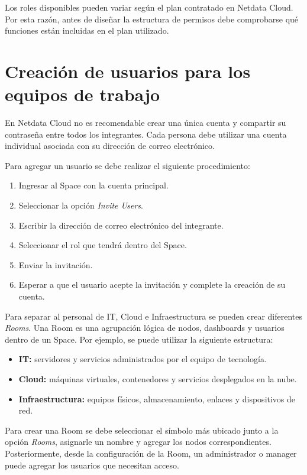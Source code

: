 Los roles disponibles pueden variar según el plan contratado en Netdata Cloud. Por esta
razón, antes de diseñar la estructura de permisos debe comprobarse qué funciones están
incluidas en el plan utilizado.

\section{Creación de usuarios para los equipos de trabajo}

En Netdata Cloud no es recomendable crear una única cuenta y compartir su contraseña
entre todos los integrantes. Cada persona debe utilizar una cuenta individual asociada
con su dirección de correo electrónico.

Para agregar un usuario se debe realizar el siguiente procedimiento:

\begin{enumerate}
    \item Ingresar al Space con la cuenta principal.
    \item Seleccionar la opción \textit{Invite Users}.
    \item Escribir la dirección de correo electrónico del integrante.
    \item Seleccionar el rol que tendrá dentro del Space.
    \item Enviar la invitación.
    \item Esperar a que el usuario acepte la invitación y complete la creación de su
          cuenta.
\end{enumerate}

Para separar al personal de IT, Cloud e Infraestructura se pueden crear diferentes
\textit{Rooms}. Una Room es una agrupación lógica de nodos, dashboards y usuarios
dentro de un Space. Por ejemplo, se puede utilizar la siguiente estructura:

\begin{itemize}
    \item \textbf{IT:} servidores y servicios administrados por el equipo de tecnología.
    \item \textbf{Cloud:} máquinas virtuales, contenedores y servicios desplegados en la
          nube.
    \item \textbf{Infraestructura:} equipos físicos, almacenamiento, enlaces y
          dispositivos de red.
\end{itemize}

Para crear una Room se debe seleccionar el símbolo más ubicado junto a la opción
\textit{Rooms}, asignarle un nombre y agregar los nodos correspondientes. Posteriormente,
desde la configuración de la Room, un administrador o manager puede agregar los
usuarios que necesitan acceso.

